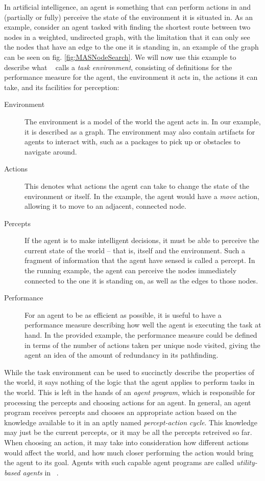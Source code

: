 In artificial intelligence, an agent is something that can perform
actions in and (partially or fully) perceive the state of the environment
it is situated in. As an example, consider an agent tasked with finding
the shortest route between two nodes in a weighted, undirected graph,
with the limitation that it can only see the nodes that have an edge
to the one it is standing in, an example of the graph can be seen
on fig. \ref{fig:MASNodeSearch}. We will now use this example to
describe what ~\cite{Norvig96} calls a \emph{task environment}, consisting
of definitions for the performance measure for the agent, the environment
it acts in, the actions it can take, and its facilities for perception:
\begin{description}
\item [{Environment}] The environment is a model of the world the agent
acts in. In our example, it is described as a graph. The environment
may also contain artifacts for agents to interact with, such as a
packages to pick up or obstacles to navigate around.
\item [{Actions}] This denotes what actions the agent can take to change
the state of the environment or itself. In the example, the agent
would have a \emph{move} action, allowing it to move to an adjacent,
connected node.
\item [{Percepts}] If the agent is to make intelligent decisions, it must
be able to perceive the current state of the world -- that is, itself
and the environment. Such a fragment of information that the agent
have sensed is called a percept. In the running example, the agent
can perceive the nodes immediately connected to the one it is standing
on, as well as the edges to those nodes.
\item [{Performance}] For an agent to be as efficient as possible, it is
useful to have a performance measure describing how well the agent
is executing the task at hand. In the provided example, the performance
measure could be defined in terms of the number of actions taken per
unique node visited, giving the agent an idea of the amount of redundancy
in its pathfinding.
\end{description}
While the task environment can be used to succinctly describe the
properties of the world, it says nothing of the logic that the agent
applies to perform tasks in the world. This is left in the hands of
an \emph{agent program}, which is responsible for processing the percepts
and choosing actions for an agent. In general, an agent program receives
percepts and chooses an appropriate action based on the knowledge
available to it in an aptly named \emph{percept-action} \emph{cycle}.
This knowledge may just be the current percepts, or it may be all
the percepts retreived so far. When choosing an action, it may take
into consideration how different actions would affect the world, and
how much closer performing the action would bring the agent to its
goal. Agents with such capable agent programs are called \emph{utility-based
agents} in ~\cite{Norvig96}.



